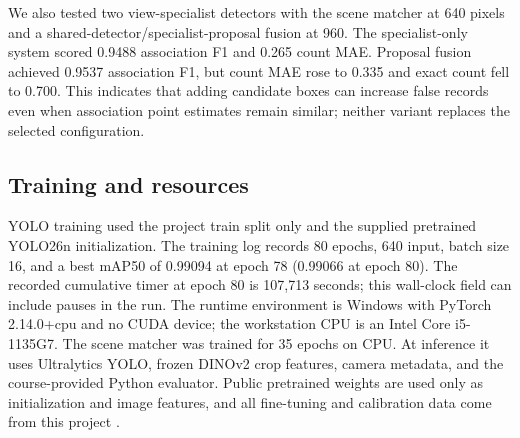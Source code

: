 We also tested two view-specialist detectors with the scene matcher at 640 pixels and a shared-detector/specialist-proposal fusion at 960. The specialist-only system scored 0.9488 association F1 and 0.265 count MAE. Proposal fusion achieved 0.9537 association F1, but count MAE rose to 0.335 and exact count fell to 0.700. This indicates that adding candidate boxes can increase false records even when association point estimates remain similar; neither variant replaces the selected configuration.

\subsection{Training and resources}
YOLO training used the project train split only and the supplied pretrained YOLO26n initialization. The training log records 80 epochs, 640 input, batch size 16, and a best mAP50 of 0.99094 at epoch 78 (0.99066 at epoch 80). The recorded cumulative timer at epoch 80 is 107,713 seconds; this wall-clock field can include pauses in the run. The runtime environment is Windows with PyTorch 2.14.0+cpu and no CUDA device; the workstation CPU is an Intel Core i5-1135G7. The scene matcher was trained for 35 epochs on CPU. At inference it uses Ultralytics YOLO, frozen DINOv2 crop features, camera metadata, and the course-provided Python evaluator. Public pretrained weights are used only as initialization and image features, and all fine-tuning and calibration data come from this project \cite{yolo26,dinov2}.
